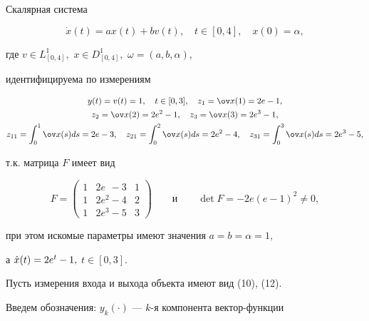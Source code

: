 \begin{exam}


Скалярная система


$$


\Dot{x}(t) =ax(t) + b v(t),\quad t\in[0,4],\quad x(0)=\alpha,


$$


где $v\in L_{[0,4]}^1,$ $x\in D_{[0,4]}^1,$ $\omega=(a, b, \alpha),$


идентифицируема по измерениям


\begin{gather*}


y(t)=v(t)=1,\quad t\in[0,3],\quad z_1=\ov x(1)=2e-1,\\


z_2 =\ov x(2)=2e^2-1,\quad z_3=\ov x(3)=2e^3-1,\\


z_{11}=\int_0^1\ov x(s)ds = 2e-3,\quad


z_{21}=\int_0^2\ov x(s)ds = 2e^2-4,\quad


z_{31}=\int_0^3\ov x(s)ds = 2e^3-5,


\end{gather*}


т.к. матрица $F$ имеет вид


$$


F=


\begin{pmatrix}


1 & 2e^{\phantom{2}}-3 & 1\\


1 & 2e^2-4 &2\\


1 & 2e^3-5 & 3


\end{pmatrix}


\qquad


\text{и}\qquad \det F = -2e(e-1)^2\ne 0,


$$


при этом искомые параметры имеют значения $a=b=\alpha=1,$


а $\Hat x(t) = 2e^t-1,$ $t\in[0,3].$


\end{exam}





Пусть измерения входа и выхода объекта имеют вид (10), (12).


Введем обозначения: $y_k(\cdot)$ --- $k$-я компонента вектор-функции


